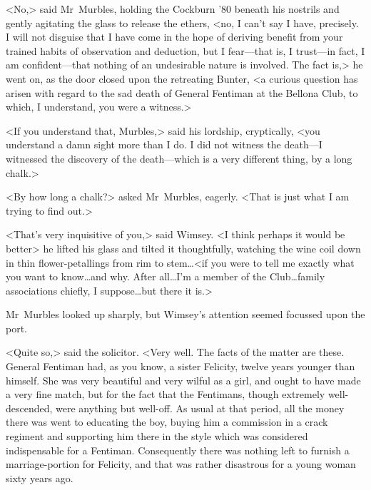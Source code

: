 <No,> said Mr~Murbles, holding the Cockburn '80 beneath his nostrils and gently agitating the glass to release the ethers, <no, I can't say I have, precisely. I will not disguise that I have come in the hope of deriving benefit from your trained habits of observation and deduction, but I fear—that is, I trust—in fact, I am confident—that nothing of an undesirable nature is involved. The fact is,> he went on, as the door closed upon the retreating Bunter, <a curious question has arisen with regard to the sad death of General Fentiman at the Bellona Club, to which, I understand, you were a witness.>

<If you understand that, Murbles,> said his lordship, cryptically, <you understand a damn sight more than I do. I did not witness the death—I witnessed the discovery of the death—which is a very different thing, by a long chalk.>

<By how long a chalk?> asked Mr~Murbles, eagerly. <That is just what I am trying to find out.>

<That's very inquisitive of you,> said Wimsey. <I think perhaps it would be better\longdots> he lifted his glass and tilted it thoughtfully, watching the wine coil down in thin flower-petallings from rim to stem\dots  <if you were to tell me exactly what you want to know\dots  and why. After all\dots  I'm a member of the Club\dots  family associations chiefly, I suppose\dots  but there it is.>

Mr~Murbles looked up sharply, but Wimsey's attention seemed focussed upon the port.

<Quite so,> said the solicitor. <Very well. The facts of the matter are these. General Fentiman had, as you know, a sister Felicity, twelve years younger than himself. She was very beautiful and very wilful as a girl, and ought to have made a very fine match, but for the fact that the Fentimans, though extremely well-descended, were anything but well-off. As usual at that period, all the money there was went to educating the boy, buying him a commission in a crack regiment and supporting him there in the style which was considered indispensable for a Fentiman. Consequently there was nothing left to furnish a marriage-portion for Felicity, and that was rather disastrous for a young woman sixty years ago.

